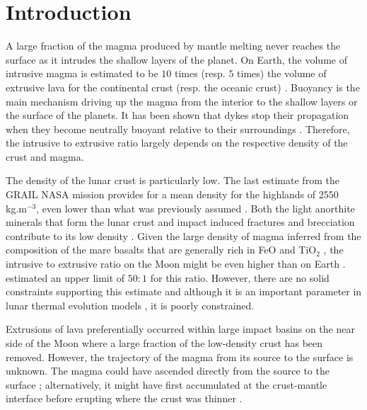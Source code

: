 \section{Introduction}
\label{C5-Introduction}

A large fraction of the magma produced by mantle melting never reaches
the surface as it intrudes the shallow layers of the planet. On Earth,
the volume of intrusive magma is estimated to be $10$ times (resp. $5$
times) the volume  of extrusive lava for the  continental crust (resp.
the  oceanic  crust)  \citep{Crisp:1984dm}.    Buoyancy  is  the  main
mechanism driving up the magma from the interior to the shallow layers
or the  surface of  the planets.   It has been  shown that  dykes stop
their propagation when they become neutrally buoyant relative to their
surroundings       \citep{Walker:1989jq,Rivalta:2005kd,Taisne:2009va}.
Therefore, the  intrusive to  extrusive ratio  largely depends  on the
respective density of the crust and magma.
	
The density of the lunar crust is particularly low.  The last estimate
from  the GRAIL  NASA  mission provides  for a  mean  density for  the
highlands of  2550 kg.m$^{-3}$,  even lower  than what  was previously
assumed \citep{Wieczorek:2013ipa}.  Both  the light anorthite minerals
that form the lunar crust and impact induced fractures and brecciation
contribute  to its  low  density  \citep{Wilhelms:1987vb}.  Given  the
large  density of  magma inferred  from  the composition  of the  mare
basalts   that    are   generally   rich   in    FeO   and   TiO$_{2}$
\citep{Wieczorek:2001jt}, the intrusive to extrusive ratio on the Moon
might       be       even       higher       than       on       Earth
\citep{ElBaz:1970kc,Wilson:1981fm,Hiesinger:2006cb,Glotch:2010ih}. \citet{Head:1992bk}
estimated an upper limit of $50:1$ for this ratio.  However, there are
no solid  constraints supporting this  estimate and although it  is an
important    parameter    in    lunar   thermal    evolution    models
\citep{Laneuville:2013gp}, it is poorly constrained.
	
Extrusions of lava preferentially  occurred within large impact basins
on the near side of the Moon where a large fraction of the low-density
crust has been removed. However, the  trajectory of the magma from its
source  to the  surface  is  unknown. The  magma  could have  ascended
directly  from the  source  to  the surface  \citep{Wieczorek:2001jt};
alternatively,  it might  have first  accumulated at  the crust-mantle
interface   before    erupting   where    the   crust    was   thinner
\citep{Wilson:1981fm}.
	
